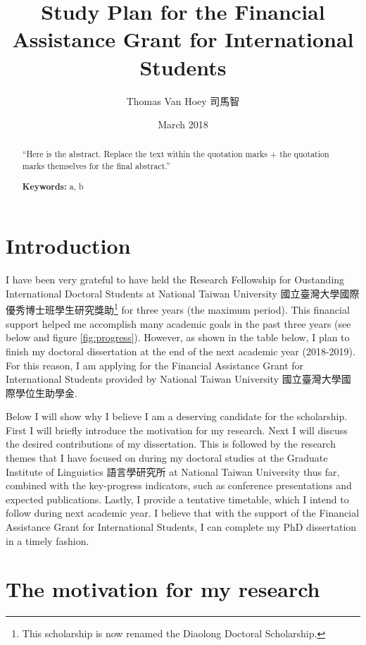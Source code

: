 \documentclass[12pt,]{article}
\title{Study Plan for the Financial Assistance Grant for International Students}
\author{Thomas Van Hoey 司馬智}
\date{March 2018}
\let\rmarkdownfootnote\footnote%
\def\footnote{\protect\rmarkdownfootnote}
\theoremstyle{definition}
\theoremstyle{definition}
\theoremstyle{definition}
\theoremstyle{remark}
\begin{document}
\maketitle

\begin{abstract}
\noindent ``Here is the abstract. Replace the text within the quotation
marks + the quotation marks themselves for the final abstract.''
\par \textbf{Keywords:} a, b
\end{abstract}

\section{Introduction}\label{introduction}

I have been very grateful to have held the Research Fellowship for
Oustanding International Doctoral Students at National Taiwan University
國立臺灣大學國際優秀博士班學生研究獎助\footnote{This scholarship is now
  renamed the Diaolong Doctoral Scholarship.} for three years (the
maximum period). This financial support helped me accomplish many
academic goals in the past three years (see below and figure
\ref{fig:progress}). However, as shown in the table below, I plan to
finish my doctoral dissertation at the end of the next academic year
(2018-2019). For this reason, I am applying for the Financial Assistance
Grant for International Students provided by National Taiwan University
國立臺灣大學國際學位生助學金.

Below I will show why I believe I am a deserving candidate for the
scholarship. First I will briefly introduce the motivation for my
research. Next I will discuss the desired contributions of my
dissertation. This is followed by the research themes that I have
focused on during my doctoral studies at the Graduate Institute of
Linguistics 語言學研究所 at National Taiwan University thus far,
combined with the key-progress indicators, such as conference
presentations and expected publications. Lastly, I provide a tentative
timetable, which I intend to follow during next academic year. I believe
that with the support of the Financial Assistance Grant for
International Students, I can complete my PhD dissertation in a timely
fashion.

\section{The motivation for my
research}\label{the-motivation-for-my-research}
\end{document}
